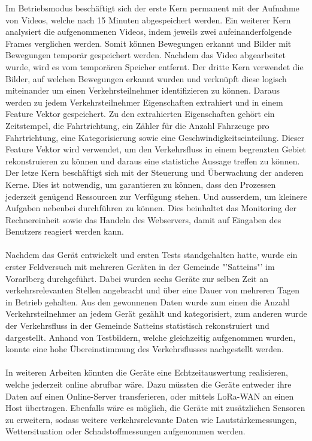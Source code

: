 Im Betriebsmodus beschäftigt sich der erste Kern permanent mit der Aufnahme von Videos, welche nach 15 Minuten abgespeichert werden. Ein weiterer Kern analysiert die aufgenommenen Videos, indem jeweils zwei aufeinanderfolgende Frames verglichen werden. Somit können Bewegungen erkannt und Bilder mit Bewegungen temporär gespeichert werden. Nachdem das Video abgearbeitet wurde, wird es vom temporären Speicher entfernt. Der dritte Kern verwendet die Bilder, auf welchen Bewegungen erkannt wurden und verknüpft diese logisch miteinander um einen Verkehrsteilnehmer identifizieren zu können. Daraus werden zu jedem Verkehrsteilnehmer Eigenschaften extrahiert und in einem Feature Vektor gespeichert. Zu den extrahierten Eigenschaften gehört ein Zeitstempel, die Fahrtrichtung, ein Zähler für die Anzahl Fahrzeuge pro Fahrtrichtung, eine Kategorisierung sowie eine Geschwindigkeitseinteilung. Dieser Feature Vektor wird verwendet, um den Verkehrsfluss in einem begrenzten Gebiet rekonstruieren zu können und daraus eine statistiche Aussage treffen zu können. Der letze Kern beschäftigt sich mit der Steuerung und Überwachung der anderen Kerne. Dies ist notwendig, um garantieren zu können, dass den Prozessen jederzeit genügend Ressourcen zur Verfügung stehen. Und ausserdem, um kleinere Aufgaben nebenbei durchführen zu können. Dies beinhaltet das Monitoring der Rechnereinheit sowie das Handeln des Webservers, damit auf Eingaben des Benutzers reagiert werden kann. \\\\
Nachdem das Gerät entwickelt und ersten Tests standgehalten hatte, wurde ein erster Feldversuch mit mehreren Geräten in der Gemeinde "'Satteins"' im Vorarlberg durchgeführt. Dabei wurden sechs Geräte zur selben Zeit an verkehrsrelevanten Stellen angebracht und über eine Dauer von mehreren Tagen in Betrieb gehalten. Aus den gewonnenen Daten wurde zum einen die Anzahl Verkehrsteilnehmer an jedem Gerät gezählt und kategorisiert, zum anderen wurde der Verkehrsfluss in der Gemeinde Satteins statistisch rekonstruiert und dargestellt. Anhand von Testbildern, welche gleichzeitig aufgenommen wurden, konnte eine hohe Übereinstimmung des Verkehrsflusses nachgestellt werden.\\\\
In weiteren Arbeiten könnten die Geräte eine Echtzeitauswertung realisieren, welche jederzeit online abrufbar wäre. Dazu müssten die Geräte entweder ihre Daten auf einen Online-Server transferieren, oder mittels LoRa-WAN an einen Host übertragen. Ebenfalls wäre es möglich, die Geräte mit zusätzlichen Sensoren zu erweitern, sodass weitere verkehrsrelevante Daten wie Lautstärkemessungen, Wettersituation oder Schadstoffmessungen aufgenommen werden.
\newpage
